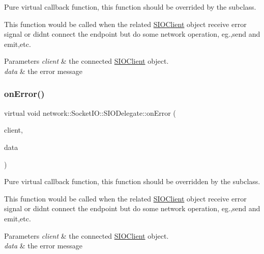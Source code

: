 Pure virtual callback function, this function should be overrided by the subclass.

This function would be called when the related \hyperlink{classnetwork_1_1SIOClient}{S\+I\+O\+Client} object receive error signal or didn\textquotesingle{}t connect the endpoint but do some network operation, eg.,send and emit,etc.


\begin{DoxyParams}{Parameters}
{\em client} & the connected \hyperlink{classnetwork_1_1SIOClient}{S\+I\+O\+Client} object. \\
\hline
{\em data} & the error message \\
\hline
\end{DoxyParams}
\mbox{\label{classnetwork_1_1SocketIO_1_1SIODelegate_a906cad51ad2efe52ffe41047239c6f5d}} 
\subsubsection{\texorpdfstring{on\+Error()}{onError()}\hspace{0.1cm}{\footnotesize\ttfamily [2/2]}}
{\footnotesize\ttfamily virtual void network\+::\+Socket\+I\+O\+::\+S\+I\+O\+Delegate\+::on\+Error (\begin{DoxyParamCaption}\item[{\hyperlink{classnetwork_1_1SIOClient}{S\+I\+O\+Client} $\ast$}]{client,  }\item[{const std\+::string \&}]{data }\end{DoxyParamCaption})\hspace{0.3cm}{\ttfamily [pure virtual]}}

Pure virtual callback function, this function should be overridden by the subclass.

This function would be called when the related \hyperlink{classnetwork_1_1SIOClient}{S\+I\+O\+Client} object receive error signal or didn\textquotesingle{}t connect the endpoint but do some network operation, eg.,send and emit,etc.


\begin{DoxyParams}{Parameters}
{\em client} & the connected \hyperlink{classnetwork_1_1SIOClient}{S\+I\+O\+Client} object. \\
\hline
{\em data} & the error message \\
\hline
\end{DoxyParams}
\mbox{\label{classnetwork_1_1SocketIO_1_1SIODelegate_aa498be5838a65bdb5a42707de71a5d2a}} 
